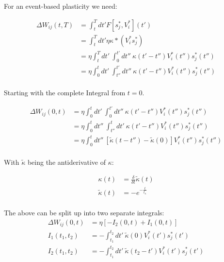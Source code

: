 \documentclass[12pt,a4paper,titlepage]{report}
\begin{document}
For an event-based plasticity we need:

\begin{align}
  \Delta W_{ij}(t,T) & = \int_t^T dt' F[s_j^\ast , V_i^\ast ](t')                                                 \\
                     & = \int_t^T dt' \eta \kappa \ast (V_i^\ast s_j^\ast)                                        \\
                     & = \eta \int_t^T dt' \  \int_0^{t'} dt'' \ \kappa(t'-t'') V_i^\ast (t'') s_j^\ast (t'')     \\
                     & = \eta \int_0^t dt' \  \int_{t''}^{t'} dt'' \ \kappa(t'-t'') V_i^\ast (t'') s_j^\ast (t'') \\
\end{align}


Starting with the complete Integral from $t=0$.

\begin{align*}
  \Delta W_{ij}(0,t) & =\eta \int_0^t dt' \  \int_0^{t'} dt'' \ \kappa(t'-t'') V_i^\ast (t'') s_j^\ast (t'')                          \\
                     & = \eta \int_0^t dt'' \  \int_{t''}^{t} dt' \ \kappa(t'-t'') V_i^\ast (t'') s_j^\ast (t'')                      \\
                     & = \eta \int_0^t dt'' \  \left[ \tilde{\kappa}(t-t'') - \tilde{\kappa}(0) \right] V_i^\ast (t'') s_j^\ast (t'') \\
\end{align*}

With $\tilde{\kappa}$ being the antiderivative of $\kappa$:

\begin{align*}
  \kappa(t)         & = \frac{\delta}{\delta t} \tilde{\kappa}(t) \\
  \tilde{\kappa}(t) & = - e^{-\frac{t}{t_{\kappa}}}               \\
\end{align*}

The above can be split up into two separate integrals:
\begin{align*}
  \Delta W_{ij}(0,t) & =\eta \left[ -I_2 (0, t) + I_1(0,t) \right]                                      \\
  I_1(t_1, t_2)      & = - \int_{t_1}^{t_2} dt' \ \tilde{\kappa} (0) V_i^\ast (t') s_j^\ast (t')        \\
  I_2(t_1, t_2)      & = - \int_{t_1}^{t_2} dt' \ \tilde{\kappa} (t_2 - t') V_i^\ast (t') s_j^\ast (t') \\
\end{align*}
\end{document}
